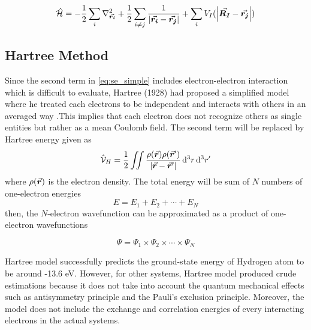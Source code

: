 \begin{equation} \label{eq:se_simple}
	\hat{\mathcal{H}}  = - \frac{1}{2} \sum_i \laplacian_{\va*{r_i}} + \frac{1}{2} \sum_{i\neq j} \frac{1}{\abs{\va*{r_i} - \va*{r_j}}} + \sum_{i} V_{I}(\abs{\va*{R_I} - \va*{r_j}})
\end{equation}
\subsection{Hartree Method}
Since the second term in \eqref{eq:se_simple} includes electron-electron interaction which is difficult to evaluate, Hartree (1928) had proposed a simplified model where he treated each electrons to be independent and interacts with others in an averaged way \citep{Hartree1928}.This implies that each  electron does not recognize others as single entities but rather as a mean Coulomb field. The second term will be replaced by Hartree energy given as
\begin{equation}
	\hat{\mathcal{V}}_H = \frac{1}{2} \iint \frac{\rho(\va*{r}) \rho(\va*{r}')}{\abs{{\va*{r} - \va*{r}'}}} \dd[3]{r} \dd[3]{r'}
\end{equation}
where $\rho(\va*{r})$ is the electron density. The total energy will be sum of $N$ numbers of one-electron energies
\begin{equation}
	E = E_1 + E_2 + \cdots + E_N
\end{equation}
then, the $N$-electron wavefunction can be approximated as a product of one-electron wavefunctions

\begin{equation}
	\Psi = \Psi_1 \times \Psi_2 \times \cdots \times \Psi_N
\end{equation}

Hartree model successfully predicts the ground-state energy of Hydrogen atom to be around -13.6 eV. However, for other systems, Hartree model produced crude estimations because it does not take into account the quantum mechanical effects such as antisymmetry principle and the Pauli's exclusion principle. Moreover, the model does not include the exchange and correlation energies of every interacting electrons in the actual systems.

